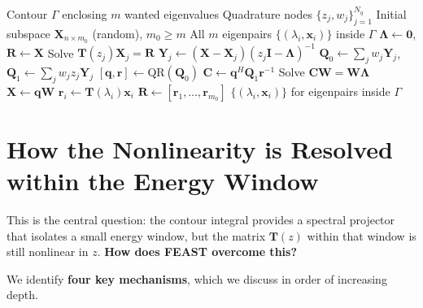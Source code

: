 \documentclass[12pt,a4paper]{article}
\theoremstyle{definition}
\newcommand{\key}[1]{\textcolor{keypoint}{\textbf{#1}}}
\begin{document}
\begin{algorithm}[htbp]
\caption{FEAST Algorithm for Nonlinear Eigenvalue Problems $\mathbf{T}(\lambda)\mathbf{x} = \mathbf{0}$}
\label{alg:feast}
\begin{algorithmic}[1]
\Require Contour $\Gamma$ enclosing $m$ wanted eigenvalues
\Require Quadrature nodes $\{z_j, w_j\}_{j=1}^{N_q}$
\Require Initial subspace $\mathbf{X}_{n \times m_0}$ (random), $m_0 \geq m$
\Ensure All $m$ eigenpairs $\{(\lambda_i, \mathbf{x}_i)\}$ inside $\Gamma$
\State $\mathbf{\Lambda} \leftarrow \mathbf{0}$, $\mathbf{R} \leftarrow \mathbf{X}$ 
     
        \State Solve $\mathbf{T}(z_j)\mathbf{X}_j = \mathbf{R}$
        \State $\mathbf{Y}_j \leftarrow (\mathbf{X} - \mathbf{X}_j)(z_j\mathbf{I} - \mathbf{\Lambda})^{-1}$
    \EndFor
    \State $\mathbf{Q}_0 \leftarrow \sum_{j} w_j \mathbf{Y}_j$, \quad $\mathbf{Q}_1 \leftarrow \sum_{j} w_j z_j \mathbf{Y}_j$
    \State $[\mathbf{q}, \mathbf{r}] \leftarrow \text{QR}(\mathbf{Q}_0)$ 
    \State $\mathbf{C} \leftarrow \mathbf{q}^{H}\mathbf{Q}_1\mathbf{r}^{-1}$
    \State Solve $\mathbf{C}\mathbf{W} = \mathbf{W}\mathbf{\Lambda}$ 
    \State $\mathbf{X} \leftarrow \mathbf{q}\mathbf{W}$
        \State $\mathbf{r}_i \leftarrow \mathbf{T}(\lambda_i)\mathbf{x}_i$
    \EndFor
    \State $\mathbf{R} \leftarrow [\mathbf{r}_1, \ldots, \mathbf{r}_{m_0}]$
\EndWhile
\State \Return $\{(\lambda_i, \mathbf{x}_i)\}$ for eigenpairs inside $\Gamma$
\end{algorithmic}
\end{algorithm}

\section{How the Nonlinearity is Resolved within the Energy Window}

This is the central question: the contour integral provides a spectral projector that isolates a small energy window, but the matrix $\mathbf{T}(z)$ within that window is still nonlinear in $z$. \textbf{How does FEAST overcome this?}

We identify \key{four key mechanisms}, which we discuss in order of increasing depth.
\end{document}

